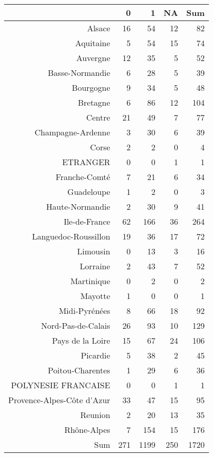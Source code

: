 \documentclass[11pt,a4paper]{article}\usepackage[]{graphicx}\usepackage[]{color}
\begin{document}
\begin{table}[H]
\centering
\begin{tabular}{rrrrr}
  \hline
 & 0 & 1 & NA & Sum \\ 
  \hline
Alsace & 16 & 54 & 12 & 82 \\ 
  Aquitaine & 5 & 54 & 15 & 74 \\ 
  Auvergne & 12 & 35 & 5 & 52 \\ 
  Basse-Normandie & 6 & 28 & 5 & 39 \\ 
  Bourgogne & 9 & 34 & 5 & 48 \\ 
  Bretagne & 6 & 86 & 12 & 104 \\ 
  Centre & 21 & 49 & 7 & 77 \\ 
  Champagne-Ardenne & 3 & 30 & 6 & 39 \\ 
  Corse & 2 & 2 & 0 & 4 \\ 
  ETRANGER & 0 & 0 & 1 & 1 \\ 
  Franche-Comté & 7 & 21 & 6 & 34 \\ 
  Guadeloupe & 1 & 2 & 0 & 3 \\ 
  Haute-Normandie & 2 & 30 & 9 & 41 \\ 
  Ile-de-France & 62 & 166 & 36 & 264 \\ 
  Languedoc-Roussillon & 19 & 36 & 17 & 72 \\ 
  Limousin & 0 & 13 & 3 & 16 \\ 
  Lorraine & 2 & 43 & 7 & 52 \\ 
  Martinique & 0 & 2 & 0 & 2 \\ 
  Mayotte & 1 & 0 & 0 & 1 \\ 
  Midi-Pyrénées & 8 & 66 & 18 & 92 \\ 
  Nord-Pas-de-Calais & 26 & 93 & 10 & 129 \\ 
  Pays de la Loire & 15 & 67 & 24 & 106 \\ 
  Picardie & 5 & 38 & 2 & 45 \\ 
  Poitou-Charentes & 1 & 29 & 6 & 36 \\ 
  POLYNESIE FRANCAISE & 0 & 0 & 1 & 1 \\ 
  Provence-Alpes-Côte d'Azur & 33 & 47 & 15 & 95 \\ 
  Reunion & 2 & 20 & 13 & 35 \\ 
  Rhône-Alpes & 7 & 154 & 15 & 176 \\ 
  Sum & 271 & 1199 & 250 & 1720 \\ 
   \hline
\end{tabular}
\end{table}
\end{document}

